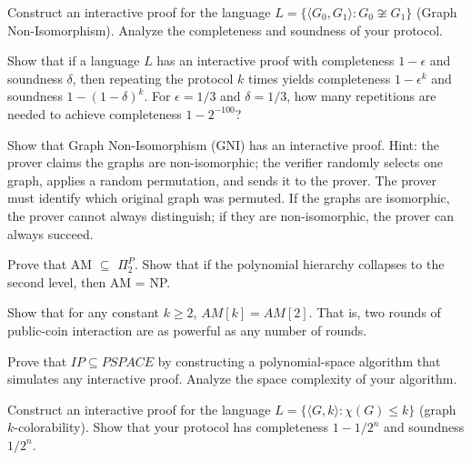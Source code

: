 \begin{exercise}[Basic]
Construct an interactive proof for the language $L = \{ \langle G_0, G_1 \rangle : G_0 \not\cong G_1 \}$ (Graph Non-Isomorphism). Analyze the completeness and soundness of your protocol.
\end{exercise}

\begin{exercise}[Basic]
Show that if a language $L$ has an interactive proof with completeness $1-\epsilon$ and soundness $\delta$, then repeating the protocol $k$ times yields completeness $1-\epsilon^k$ and soundness $1-(1-\delta)^k$. For $\epsilon = 1/3$ and $\delta = 1/3$, how many repetitions are needed to achieve completeness $1 - 2^{-100}$?
\end{exercise}

\begin{exercise}[Intermediate]
Show that Graph Non-Isomorphism (GNI) has an interactive proof. Hint: the prover claims the graphs are non-isomorphic; the verifier randomly selects one graph, applies a random permutation, and sends it to the prover. The prover must identify which original graph was permuted. If the graphs are isomorphic, the prover cannot always distinguish; if they are non-isomorphic, the prover can always succeed.
\end{exercise}

\begin{exercise}[Intermediate]
Prove that AM $\subseteq$ $\Pi_2^P$. Show that if the polynomial hierarchy collapses to the second level, then AM = NP.
\end{exercise}

\begin{exercise}[Intermediate]
Show that for any constant $k \ge 2$, $AM[k] = AM[2]$. That is, two rounds of public-coin interaction are as powerful as any number of rounds.
\end{exercise}

\begin{exercise}[Intermediate]
Prove that $IP \subseteq PSPACE$ by constructing a polynomial-space algorithm that simulates any interactive proof. Analyze the space complexity of your algorithm.
\end{exercise}

\begin{exercise}[Intermediate]
Construct an interactive proof for the language $L = \{ \langle G, k \rangle : \chi(G) \le k \}$ (graph $k$-colorability). Show that your protocol has completeness $1 - 1/2^n$ and soundness $1/2^n$.
\end{exercise}

